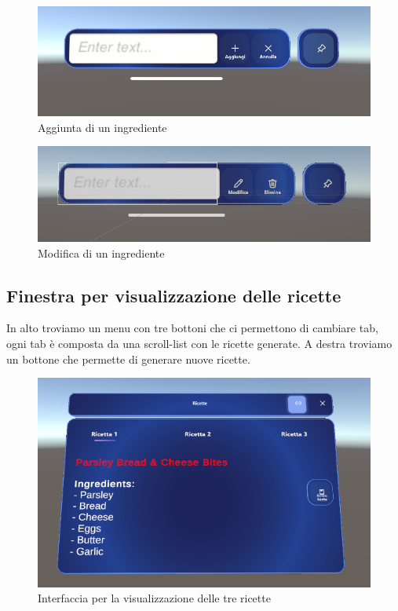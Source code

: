 \begin{figure}[H]
    \centering
    \includegraphics[width=\textwidth,height=\textheight,keepaspectratio]{figures/chapter_1/AGGIUNGI_interfaccia.png}
    \caption{Aggiunta di un ingrediente}
    \label{fig:aggiunta}
\end{figure}

\begin{figure}[H]
    \centering
    \includegraphics[width=\textwidth,height=\textheight,keepaspectratio]{figures/chapter_1/MODIFICA_interfaccia.png}
    \caption{Modifica di un ingrediente}
    \label{fig:modifica}
\end{figure}




\subsection{Finestra per visualizzazione delle ricette}
In alto troviamo un menu con tre bottoni che ci permettono di cambiare tab, ogni tab è composta da una scroll-list con le ricette generate. A destra troviamo un bottone che permette di generare nuove ricette.

\begin{figure}[H]
    \centering
    \includegraphics[width=\textwidth,height=\textheight,keepaspectratio]{figures/chapter_1/RICETTE_interfaccia.png}
    \caption{Interfaccia per la visualizzazione delle tre ricette}
    \label{fig:ricette}
\end{figure}



